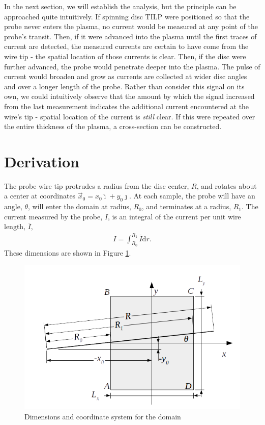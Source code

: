\documentclass{article}
\def\I{\overline{I}}
\def\d{\mathrm{d}}
\def\ui{\hat{\imath}}
\def\uj{\hat{\jmath}}
\begin{document}
In the next section, we will establish the analysis, but the principle can be approached quite intuitively.  If spinning disc TILP were positioned so that the probe never enters the plasma, no current would be measured at any point of the probe's transit.  Then, if it were advanced into the plasma until the first traces of current are detected, the measured currents are certain to have come from the wire tip - the spatial location of those currents is clear.  Then, if the disc were further advanced, the probe would penetrate deeper into the plasma.  The pulse of current would broaden and grow as currents are collected at wider disc angles and over a longer length of the probe.  Rather than consider this signal on its own, we could intuitively observe that the amount by which the signal increased from the last measurement indicates the additional current encountered at the wire's tip - spatial location of the current is \emph{still} clear.  If this were repeated over the entire thickness of the plasma, a cross-section can be constructed.

\section{Derivation}

The probe wire tip protrudes a radius from the disc center, $R$, and rotates about a center at coordinates $\vec{x}_0 = x_0\ui + y_0\uj$.  At each sample, the probe will have an angle, $\theta$, will enter the domain at radius, $R_0$, and terminates at a radius, $R_1$.  The current measured by the probe, $I$, is an integral of the current per unit wire length, $\I$,
\begin{align}
I = \int_{R_0}^{R_1} \I \d r.
\end{align}
These dimensions are shown in Figure \ref{fig:coords}.  
\begin{figure}
\centering
\includegraphics[width=.9\linewidth]{figures/coords}
\caption{Dimensions and coordinate system for the domain}\label{fig:coords}
\end{figure}
\end{document}
